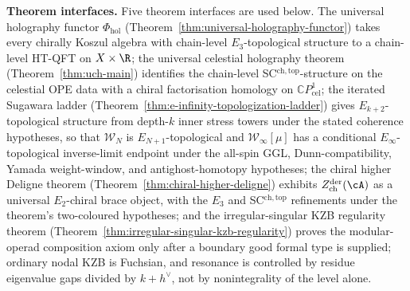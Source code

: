 \medskip\noindent\textbf{Theorem interfaces.}\enspace
Five theorem interfaces are used below. The universal holography
functor $\Phi_{\mathrm{hol}}$
(Theorem~\ref{thm:universal-holography-functor}) takes every
chirally Koszul algebra with chain-level $E_3$-topological structure
to a chain-level HT-QFT on $X \times \R$; the universal celestial
holography theorem (Theorem~\ref{thm:uch-main}) identifies the
chain-level SC$^{\mathrm{ch,top}}$-structure on the celestial OPE
data with a chiral factorisation homology on $\mathbb{C}P^1_{\mathrm{cel}}$;
the iterated Sugawara ladder
(Theorem~\ref{thm:e-infinity-topologization-ladder}) gives
$E_{k+2}$-topological structure from depth-$k$ inner stress towers
under the stated coherence hypotheses, so
that $\mathcal{W}_N$ is $E_{N+1}$-topological and
$\mathcal{W}_\infty[\mu]$ has a conditional $E_\infty$-topological
inverse-limit endpoint under the all-spin GGL, Dunn-compatibility,
Yamada weight-window, and antighost-homotopy hypotheses; the chiral higher Deligne theorem
(Theorem~\ref{thm:chiral-higher-deligne}) exhibits
$Z^{\mathrm{der}}_{\mathrm{ch}}(\cA)$ as a universal $E_2$-chiral
brace object, with the $E_3$ and SC$^{\mathrm{ch,top}}$ refinements
under the theorem's two-coloured hypotheses; and the irregular-singular
KZB regularity theorem
(Theorem~\ref{thm:irregular-singular-kzb-regularity}) proves the
modular-operad composition axiom only after a boundary good formal
type is supplied; ordinary nodal KZB is Fuchsian, and resonance is
controlled by residue eigenvalue gaps divided by $k+h^\vee$, not by
nonintegrality of the level alone.

